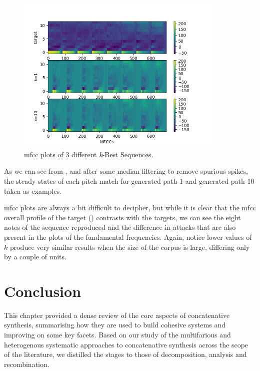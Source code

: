 {{{{{{{{\begin{figure}
	\begin{center}
		\includegraphics[width=0.9\textwidth]{ch05_pyconcat/figures/mfccs.png}
	\end{center}
	\caption[MFCC plots of 3 different \textit{k}-Best Sequences]{\acrshort{mfcc} plots of 3 different \textit{k}-Best Sequences.}
	\label{fig:mfcc_kbest}
\end{figure}

As we can see from , and after some median filtering to remove spurious spikes, the steady states of each pitch match for generated path 1 and generated path 10 taken as examples.

\acrshort{mfcc} plots are always a bit difficult to decipher, but while it is clear that the \acrshort{mfcc} overall profile of the target () contrasts with the targets, we can see the eight notes of the sequence reproduced and the difference in attacks that are also present in the plots of the fundamental frequencies. Again, notice lower values of $k$ produce very similar results when the size of the corpus is large, differing only by a couple of units.

\pagebreak

\section{Conclusion}

This chapter provided a dense review of the core aspects of concatenative synthesis, summarising how they are used to build cohesive systems and improving on some key facets. Based on our study of the multifarious and heterogenous systematic approaches to concatenative synthesis across the scope of the literature, we distilled the stages to those of decomposition, analysis and recombination. 

}}}}}}}}
